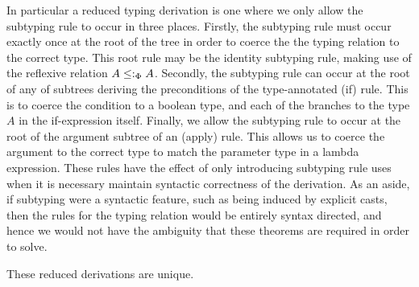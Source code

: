 \documentclass{Report}
\begin{document}
In particular a reduced typing derivation is one where we only allow the subtyping rule to occur in three places. Firstly, the subtyping rule must occur exactly once at the root of the tree in order to coerce the the typing relation to the correct type. This root rule may be the identity subtyping rule, making use of the reflexive relation $A \leq:_\Phi A$. Secondly, the subtyping rule can occur at the root of any of subtrees deriving the preconditions of the type-annotated (if) rule. This is to coerce the condition to a boolean type, and each of the branches to the type $A$ in the if-expression itself. Finally, we allow the subtyping rule to occur at the root of the argument subtree of an (apply) rule. This allows us to coerce the argument to the correct type to match the parameter type in a lambda expression. These rules have the effect of only introducing subtyping rule uses when it is necessary maintain syntactic correctness of the derivation. As an aside, if subtyping were a syntactic feature, such as being induced by explicit casts, then the rules for the typing relation would be entirely syntax directed, and hence we would not have the ambiguity that these theorems are required in order to solve.

\begin{theorem}
    These reduced derivations are unique.    
\end{theorem}
\end{document}
